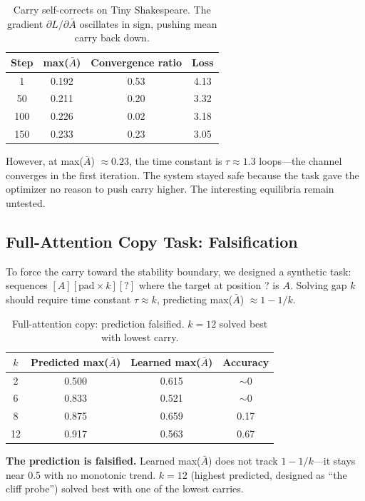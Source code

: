 \documentclass[11pt]{article}
\begin{document}
\begin{table}[ht]
\centering
\begin{tabular}{@{}cccc@{}}
\toprule
Step & max($\bar{A}$) & Convergence ratio & Loss \\
\midrule
1 & 0.192 & 0.53 & 4.13 \\
50 & 0.211 & 0.20 & 3.32 \\
100 & 0.226 & 0.02 & 3.18 \\
150 & 0.233 & 0.23 & 3.05 \\
\bottomrule
\end{tabular}
\caption{Carry self-corrects on Tiny Shakespeare. The gradient $\partial L / \partial \bar{A}$ oscillates in sign, pushing mean carry back down.}
\label{tab:tinyshakes}
\end{table}

However, at max($\bar{A}$) $\approx 0.23$, the time constant is $\tau \approx 1.3$ loops---the channel converges in the first iteration. The system stayed safe because the task gave the optimizer no reason to push carry higher. The interesting equilibria remain untested.

\subsection{Full-Attention Copy Task: Falsification}
\label{subsec:full-attn}

To force the carry toward the stability boundary, we designed a synthetic task: sequences $[A][\text{pad} \times k][?]$ where the target at position ? is $A$. Solving gap $k$ should require time constant $\tau \approx k$, predicting max($\bar{A}$) $\approx 1 - 1/k$.

\begin{table}[ht]
\centering
\begin{tabular}{@{}cccc@{}}
\toprule
$k$ & Predicted max($\bar{A}$) & Learned max($\bar{A}$) & Accuracy \\
\midrule
2 & 0.500 & 0.615 & $\sim$0 \\
6 & 0.833 & 0.521 & $\sim$0 \\
8 & 0.875 & 0.659 & 0.17 \\
12 & 0.917 & 0.563 & 0.67 \\
\bottomrule
\end{tabular}
\caption{Full-attention copy: prediction falsified. $k=12$ solved best with lowest carry.}
\label{tab:full-attn-copy}
\end{table}

\textbf{The prediction is falsified.} Learned max($\bar{A}$) does not track $1-1/k$---it stays near 0.5 with no monotonic trend. $k=12$ (highest predicted, designed as ``the cliff probe'') solved best with one of the lowest carries.
\end{document}
